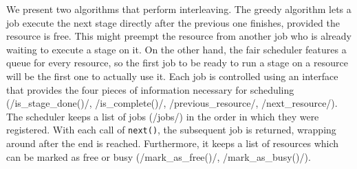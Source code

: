 We present two algorithms that perform interleaving. The greedy algorithm lets a job execute the next stage directly after the previous one finishes, provided the resource is free. This might preempt the resource from another job who is already waiting to execute a stage on it. On the other hand, the fair scheduler features a queue for every resource, so the first job to be ready to run a stage on a resource will be the first one to actually use it. Each job is controlled using an interface that provides the four pieces of information necessary for scheduling (\pythoninline/is_stage_done()/, \pythoninline/is_complete()/, \pythoninline/previous_resource/, \pythoninline/next_resource/). The scheduler keeps a list of jobs (\pythoninline/jobs/) in the order in which they were registered. With each call of \texttt{next()}, the subsequent job is returned, wrapping around after the end is reached.  Furthermore, it keeps a list of resources which can be marked as free or busy (\pythoninline/mark_as_free()/, \pythoninline/mark_as_busy()/).
